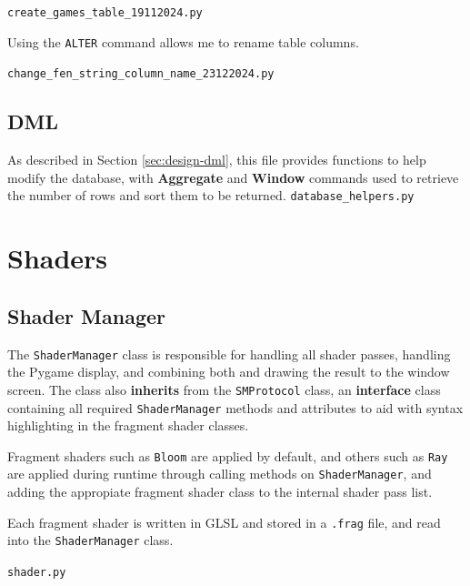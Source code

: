 \documentclass[../main/main.tex]{subfiles}
\begin{document}
\noindent\verb|create_games_table_19112024.py|

Using the \lstinline{ALTER} command allows me to rename table columns.

\bigskip
\noindent\verb|change_fen_string_column_name_23122024.py|


\subsection{DML}
\label{sec:dml}
As described in Section \ref{sec:design-dml}, this file provides functions to help modify the database, with \textbf{Aggregate} and \textbf{Window} commands used to retrieve the number of rows and sort them to be returned.
\noindent\verb|database_helpers.py|


\section{Shaders}
\subsection{Shader Manager}
The \lstinline{ShaderManager} class is responsible for handling all shader passes, handling the Pygame display, and combining both and drawing the result to the window screen. The class also \textbf{inherits} from the \lstinline{SMProtocol} class, an \textbf{interface} class containing all required \lstinline{ShaderManager} methods and attributes to aid with syntax highlighting in the fragment shader classes.

Fragment shaders such as \lstinline{Bloom} are applied by default, and others such as \lstinline{Ray} are applied during runtime through calling methods on \lstinline{ShaderManager}, and adding the appropiate fragment shader class to the internal shader pass list.

Each fragment shader is written in GLSL and stored in a \lstinline{.frag} file, and read into the \lstinline{ShaderManager} class.

\noindent\verb|shader.py|

\end{document}
